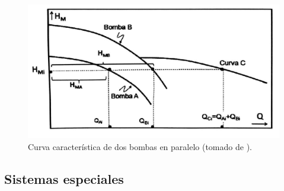 \documentclass[11pt, oneside]{article}
\begin{document}
\begin{figure}[h]
\centering
\includegraphics[width=12cm]{./figs/bom25.jpeg}
\caption{Curva caracter\'istica de dos bombas en paralelo (tomado de \cite{agudelo2011mecanica}).} 
\label{bom25}
\end{figure}


\subsection{Sistemas especiales}



\end{document}
